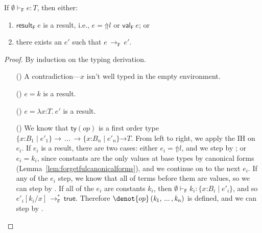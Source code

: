 \documentclass[9pt]{extarticle}
\newcommand{\ottnt}[1]{\mathit{#1}}
\newcommand{\ottmv}[1]{\mathit{#1}}
\newcommand{\ottsym}[1]{#1}
\begin{document}
{\begin{lemma}
  \label{lem:forgetfulprogress}
  If $ \emptyset   \vdash _{  \mathsf{F}  }  \ottnt{e}  :  \ottnt{T} $, then either:
  \begin{enumerate}
  \item $ \mathsf{result} _{  \mathsf{F}  }~ \ottnt{e} $ is a result, i.e., $\ottnt{e}  \ottsym{=}   \mathord{\Uparrow}  \ottnt{l} $ or $ \mathsf{val} _{  \mathsf{F}  }~ \ottnt{e} $; or
  \item there exists an $\ottnt{e'}$ such that $\ottnt{e} \,  \longrightarrow _{  \mathsf{F}  }  \, \ottnt{e'}$.
  \end{enumerate}
\begin{proof}
    By induction on the typing derivation.
{\iffull
    \begin{itemize}
    \item[(\T{Var})] A contradiction---$\mathit{x}$ isn't well typed in the
      empty environment.

    \item[(\T{Const})] $\ottnt{e}  \ottsym{=}  \ottnt{k}$ is a result.

    \item[(\T{Abs})] $\ottnt{e}  \ottsym{=}   \lambda \mathit{x} \mathord{:} \ottnt{T} .~  \ottnt{e'} $ is a result.

    \item[(\T{Op})] We know that $ \mathsf{ty} (\mathord{ \ottnt{op} }) $ is a first order type
      $ {}   \{ \mathit{x} \mathord{:} \ottnt{B_{{\mathrm{1}}}} \mathrel{\mid} \ottnt{e'_{{\mathrm{1}}}} \}   \rightarrow \, ... \, \rightarrow   \{ \mathit{x} \mathord{:} \ottnt{B_{\ottmv{n}}} \mathrel{\mid} \ottnt{e'_{\ottmv{n}}} \}   {} \mathord{ \rightarrow } \ottnt{T} $.
From left to right, we apply the IH on $\ottnt{e_{\ottmv{i}}}$. If $\ottnt{e_{\ottmv{i}}}$ is
      a result, there are two cases: either $\ottnt{e_{\ottmv{i}}}  \ottsym{=}   \mathord{\Uparrow}  \ottnt{l} $, and
      we step by ; or $\ottnt{e_{\ottmv{i}}}  \ottsym{=}  \ottnt{k_{\ottmv{i}}}$, since constants are
      the only values at base types by canonical forms
      (Lemma~\ref{lem:forgetfulcanonicalforms}), and we continue on to
      the next $\ottnt{e_{\ottmv{i}}}$. If any of the $\ottnt{e_{\ottmv{i}}}$ step, we know that all
      of terms before them are values, so we can step by
      . If all of the $\ottnt{e_{\ottmv{i}}}$ are constants $\ottnt{k_{\ottmv{i}}}$, then
      $ \emptyset   \vdash _{  \mathsf{F}  }  \ottnt{k_{\ottmv{i}}}  :   \{ \mathit{x} \mathord{:} \ottnt{B_{\ottmv{i}}} \mathrel{\mid} \ottnt{e'_{\ottmv{i}}} \}  $, and so $ \ottnt{e'_{\ottmv{i}}}  [  \ottnt{k_{\ottmv{i}}} / \mathit{x}  ]  \,  \longrightarrow ^{*}_{  \mathsf{F}  }  \,  \mathsf{true} $. Therefore $\denot{ op } \, \ottsym{(}  \ottnt{k_{{\mathrm{1}}}}  \ottsym{,} \, ... \, \ottsym{,}  \ottnt{k_{\ottmv{n}}}  \ottsym{)}$ is defined, and we
      can step by .


\end{itemize}}
\end{proof}
\end{lemma}}
\end{document}
